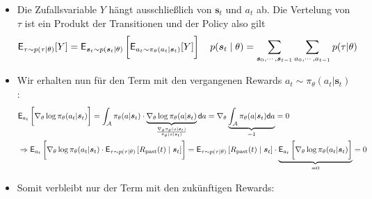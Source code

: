\documentclass[a4paper, 12pt]{scrartcl}
\begin{document}
\begin{beweis}
\begin{itemize}
        \item Die Zufallsvariable $Y$ hängt ausschließlich von $\bm{s}_t$ und $a_t$ ab. 
        Die Vertelung von $\tau$ ist ein Produkt der Transitionen und der Policy also gilt
        \begin{align*}
            \mathsf{E}_{\tau \sim p(\tau|\theta)}[Y]
            &=
            \mathsf{E}_{
                \bm{s}_t \sim p(\bm{s}_t \mid \theta)
                }
            \left[
                \vphantom{\int}
                \mathsf{E}_{a_t \sim \pi_\theta(a_t|\bm{s}_t)}[Y] 
            \right]
            \quad
            p(\bm{s}_t \mid \theta) = 
            \sum_{\bm{s}_0, \cdots , \bm{s}_{t-1}} 
            \sum_{a_0, \cdots, a_{t-1}} p(\tau|\theta)
        \end{align*}
        \item Wir erhalten nun für den Term mit den 
        vergangenen Rewards $a_t \sim \pi_\theta(a_t|\bm{s}_t)$:
        \begin{align*}
            &\mathsf{E}_{a_t}
            \left[
                \vphantom{\int}
                \nabla_{\theta} \log \pi_{\theta}(a_t|\bm{s}_t) 
            \right]
            =
            \int_{\mathcal{A}} \pi_{\theta}(a|\bm{s}_t) \cdot
            \underbrace{
                \nabla_{\theta} \log \pi_{\theta}(a |\bm{s}_t)
            }_{
                \frac{\nabla_{\theta} \pi_{\theta}(a |\bm{s}_t)}{\pi_{\theta}(a |\bm{s}_t)}
            } \mathsf{d}a
            =
            \nabla_{\theta}
            \underbrace{
                \int_{\mathcal{A}} \pi_{\theta}(a |\bm{s}_t) \mathsf{d}a
            }_{=1}
            = 0 
            \\
            &\Rightarrow \mathsf{E}_{a_t}
            \left[
                \vphantom{\int}
                \nabla_{\theta} \log \pi_{\theta}(a_t|\bm{s}_t) \cdot
                \mathsf{E}_{\tau \sim p(\tau|\theta)}
                \left[
                    R_{\text{past}}(t)  \mid \bm{s}_t
                \right]
            \right]
            =
            \mathsf{E}_{\tau \sim p(\tau|\theta)}
            \left[
                R_{\text{past}}(t)  \mid \bm{s}_t
            \right] \cdot
            \underbrace{
                \mathsf{E}_{a_t}
                \left[
                    \vphantom{\int}
                    \nabla_{\theta} \log \pi_{\theta}(a_t|\bm{s}_t)
                \right]
            }_{=0}
            = 0
        \end{align*}
        \item Somit verbleibt nur der Term mit den zukünftigen Rewards:

\end{itemize}
\end{beweis}
\end{document}
